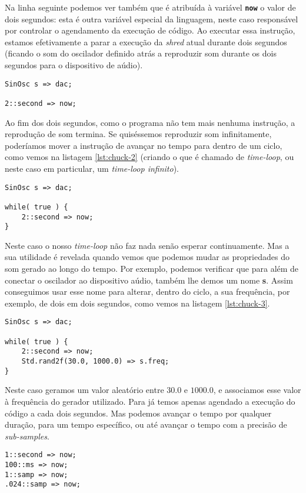 Na linha seguinte podemos ver também que é atribuída à variável \textbf{\texttt{now}} o valor de dois segundos: esta é outra variável especial da linguagem, neste caso responsável por controlar o agendamento da execução de código. Ao executar essa instrução, estamos efetivamente a parar a execução da \textit{shred} atual durante dois segundos (ficando o som do oscilador definido atrás a reproduzir som durante os dois segundos para o dispositivo de aúdio).
\begin{lstlisting}[caption={Reproduzir um oscilador durante dois segundos},label={lst:chuck-1}]
SinOsc s => dac;

2::second => now;
\end{lstlisting}

Ao fim dos dois segundos, como o programa não tem mais nenhuma instrução, a reprodução de som termina. Se quiséssemos reproduzir som infinitamente, poderíamos mover a instrução de avançar no tempo para dentro de um ciclo, como vemos na listagem \ref{lst:chuck-2} (criando o que é chamado de \textit{time-loop}, ou neste caso em particular, um \textit{time-loop infinito}).

\begin{lstlisting}[caption={Reproduzir um oscilador infinitamente},label={lst:chuck-2}]
SinOsc s => dac;

while( true ) {
    2::second => now;
}
\end{lstlisting}

Neste caso o nosso \textit{time-loop} não faz nada senão esperar continuamente. Mas a sua utilidade é revelada quando vemos que podemos mudar as propriedades do som gerado ao longo do tempo. Por exemplo, podemos verificar que para além de conectar o oscilador ao dispositivo aúdio, também lhe demos um nome \textbf{s}. Assim conseguimos usar esse nome para alterar, dentro do ciclo, a sua frequência, por exemplo, de dois em dois segundos, como vemos na listagem \ref{lst:chuck-3}.
\begin{lstlisting}[caption={Reproduzir um oscilador, variando a frequência a cada 2 segundos},label={lst:chuck-3}]
SinOsc s => dac;

while( true ) {
    2::second => now;
    Std.rand2f(30.0, 1000.0) => s.freq;
}
\end{lstlisting}

Neste caso geramos um valor aleatório entre $30.0$ e $1000.0$, e associamos esse valor à frequência do gerador utilizado. Para já temos apenas agendado a execução do código a cada dois segundos. Mas podemos avançar o tempo por qualquer duração, para um tempo específico, ou até avançar o tempo com a precisão de \textit{sub-samples}.
\\
\begin{lstlisting}[caption={Exemplos de instruções de avanço no tempo},label={lst:chuck-4}]
1::second => now;
100::ms => now;
1::samp => now;
.024::samp => now;
\end{lstlisting}


